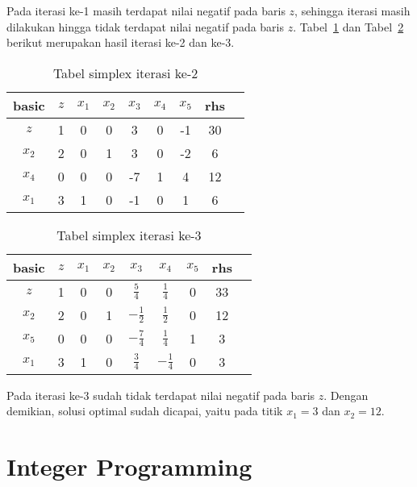 \begin{enumerate}
		Pada iterasi ke-1 masih terdapat nilai negatif pada baris $z$, sehingga iterasi masih dilakukan hingga tidak terdapat nilai negatif pada baris $z$. Tabel~\ref{tab:contoh_simplex_iterasi_2} dan Tabel~\ref{tab:contoh_simplex_iterasi_3} berikut merupakan hasil iterasi ke-2 dan ke-3.
			
		\begin{table}[H]
			\centering
			\caption{Tabel simplex iterasi ke-2}
			\label{tab:contoh_simplex_iterasi_2}
			\begin{tabular}{|c|c|c c c c c|c|c}
				\hline
			 	basic & $z$ & $x_1$ & $x_2$ & $x_3$ & $x_4$ & $x_5$ & rhs \\
				\hline
				$z$ & 1 & 0 & 0 & 3 & 0 & -1 & 30 \\
				\hline
				$x_2$ & 2 & 0 & 1 & 3 & 0 & -2 & 6 \\
				$x_4$ & 0 & 0 & 0 & -7 & 1 & 4 & 12 \\
				$x_1$ & 3 & 1 & 0 & -1 & 0 & 1 & 6 \\
				\hline
			\end{tabular}
		\end{table}

		\begin{table}[H]
			\centering
			\caption{Tabel simplex iterasi ke-3}
			\label{tab:contoh_simplex_iterasi_3}
			\begin{tabular}{|c|c|c c c c c|c|c}
				\hline
			 	basic & $z$ & $x_1$ & $x_2$ & $x_3$ & $x_4$ & $x_5$ & rhs \\
				\hline
				$z$ & 1 & 0 & 0 & $\frac{5}{4}$ & $\frac{1}{4}$ & 0 & 33 \\
				\hline
				$x_2$ & 2 & 0 & 1 & $-\frac{1}{2}$ & $\frac{1}{2}$ & 0 & 12 \\
				$x_5$ & 0 & 0 & 0 & $-\frac{7}{4}$& $\frac{1}{4}$ & 1 & 3 \\
				$x_1$ & 3 & 1 & 0 & $\frac{3}{4}$ & $-\frac{1}{4}$ & 0 & 3 \\
				\hline
			\end{tabular}
		\end{table}

		Pada iterasi ke-3 sudah tidak terdapat nilai negatif pada baris $z$. Dengan demikian, solusi optimal sudah dicapai, yaitu pada titik $x_1 = 3$ dan $x_2=12$.

\end{enumerate}

\section{Integer Programming}
\label{integer_programming}

